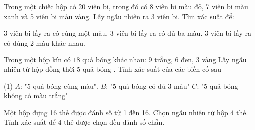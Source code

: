 \begin{vd}
	Trong một chiếc hộp có 20 viên bi, trong đó có 8  viên bi màu đỏ,  7 viên bi màu xanh và 5  viên bi màu vàng. Lấy ngẫu nhiên ra 3 viên bi. Tìm xác suất để:
	\begin{tasks}
		\task  $3$ viên bi lấy ra có cùng một màu.
		\task $3$ viên bi lấy ra có đủ ba màu.
		\task $3$ viên bi lấy ra có đúng 2  màu khác nhau.
	\end{tasks}
\end{vd} 
\begin{vd}
	Trong một hộp kín có $18$ quả bóng khác nhau: $9$ trắng, $6$ đen, $3$ vàng.Lấy ngẫu nhiên từ hộp đồng thời $5$ quả bóng . Tính xác suất của các biến cố sau
	\begin{tasks}(1)
		\task $A$: "$5$ quả bóng cùng màu".
		\task $B$: "$5$ quả bóng có đủ $3$ màu"
		\task $C$: "$5$ quả bóng không có màu trắng"
	\end{tasks}
\end{vd} 

\begin{vd}
	Một hộp đựng 16 thẻ được đánh số từ 1 đến 16. Chọn ngẫu nhiên từ hộp 4 thẻ. Tính xác suất để 4 thẻ được chọn đều đánh số chẵn.
\end{vd} 

